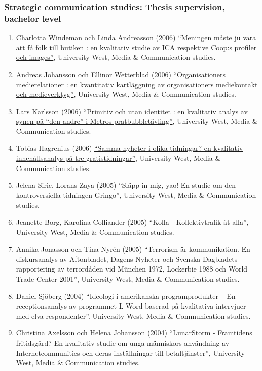 \documentclass[a4paper,11pt,oneside]{article}
\begin{document}
             \subsubsection{Strategic communication studies: Thesis supervision, bachelor level}
             \begin{enumerate}
             \item Charlotta Windeman och Linda Andreasson (2006) \href{http://urn.kb.se/resolve?urn=urn:nbn:se:hv:diva-846}{``Meningen måste ju vara att få folk till butiken : en kvalitativ studie av ICA respektive Coop:s profiler och images''},	University West, Media \& Communication studies.
             \item Andreas Johansson och Ellinor Wetterblad (2006) \href{http://urn.kb.se/resolve?urn=urn:nbn:se:hv:diva-846}{``Organisationers medierelationer : en kvantitativ kartläggning av organisationers mediekontakt och medieverktyg''},	University West, Media \& Communication studies.
             \item Lars Karlsson (2006) \href{http://www.uppsatser.se/uppsats/7e12f0e57f/}{``Primitiv och utan identitet : en kvalitativ analys av synen på ``den andre'' i Metros pratbubbletävling''},	University West, Media \& Communication studies.
             \item Tobias Hagrenius (2006) \href{http://urn.kb.se/resolve?urn=urn:nbn:se:hv:diva-851}{``Samma nyheter i olika tidningar? en kvalitativ innehållsanalys på tre gratistidningar''},	University West, Media \& Communication studies.
             \item Jelena Siric, Lorans Zaya (2005) ``Släpp in mig, yao! En studie om den kontroversiella tidningen Gringo'', 	University West, Media \& Communication studies.
             \item Jeanette Borg, Karolina Colliander (2005) ``Kolla - Kollektivtrafik åt alla'',	University West, Media \& Communication studies.
             \item Annika Jonasson och Tina Nyrén (2005) ``Terrorism är kommunikation. En diskursanalys av Aftonbladet, Dagens Nyheter och Svenska Dagbladets rapportering av terrordåden vid München 1972, Lockerbie 1988 och World Trade Center 2001'', University West, Media \& Communication studies.
             \item Daniel Sjöberg (2004) ``Ideologi i amerikanska programprodukter – En receptionsanalys av programmet L-Word baserad på kvalitativa intervjuer med elva respondenter''. University West, Media \& Communication studies.
             \item Christina Axelsson och Helena Johansson (2004) ``LunarStorm - Framtidens fritidsgård? En kvalitativ studie om unga människors användning av Internetcommunities och deras inställningar till betaltjänster'', University West, Media \& Communication studies.
           \end{enumerate}
\end{document}
